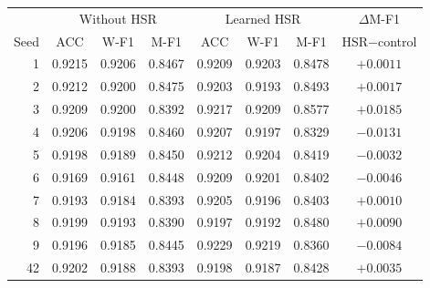 \begin{tabular}{rccccccc}
\toprule
& \multicolumn{3}{c}{Without HSR} & \multicolumn{3}{c}{Learned HSR} & $\Delta$M-F1 \\
Seed & ACC & W-F1 & M-F1 & ACC & W-F1 & M-F1 & HSR$-$control \\
\midrule
1 & 0.9215 & 0.9206 & 0.8467 & 0.9209 & 0.9203 & 0.8478 & $+0.0011$ \\
2 & 0.9212 & 0.9200 & 0.8475 & 0.9203 & 0.9193 & 0.8493 & $+0.0017$ \\
3 & 0.9209 & 0.9200 & 0.8392 & 0.9217 & 0.9209 & 0.8577 & $+0.0185$ \\
4 & 0.9206 & 0.9198 & 0.8460 & 0.9207 & 0.9197 & 0.8329 & $-0.0131$ \\
5 & 0.9198 & 0.9189 & 0.8450 & 0.9212 & 0.9204 & 0.8419 & $-0.0032$ \\
6 & 0.9169 & 0.9161 & 0.8448 & 0.9209 & 0.9201 & 0.8402 & $-0.0046$ \\
7 & 0.9193 & 0.9184 & 0.8393 & 0.9205 & 0.9196 & 0.8403 & $+0.0010$ \\
8 & 0.9199 & 0.9193 & 0.8390 & 0.9197 & 0.9192 & 0.8480 & $+0.0090$ \\
9 & 0.9196 & 0.9185 & 0.8445 & 0.9229 & 0.9219 & 0.8360 & $-0.0084$ \\
42 & 0.9202 & 0.9188 & 0.8393 & 0.9198 & 0.9187 & 0.8428 & $+0.0035$ \\
\bottomrule
\end{tabular}
